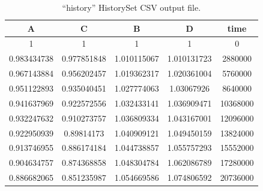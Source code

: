 \begin{table}[h!]
\centering
\caption{``history'' HistorySet CSV output file.}
\label{historyVI.I}
\begin{tabular}{|c|c|c|c|c|}
\hline
\textbf{A}                        & \textbf{C}                       & \textbf{B}                       & \textbf{D}                       & \textbf{time}                 \\ \hline
1                                 & 1                                & 1                                & 1                                & 0                             \\ \hline
0.983434738                       & 0.977851848                      & 1.010115067                      & 1.010131723                      & 2880000                       \\ \hline
0.967143884                       & 0.956202457                      & 1.019362317                      & 1.020361004                      & 5760000                       \\ \hline
0.951122893                       & 0.935040451                      & 1.027774063                      & 1.03067926                       & 8640000                       \\ \hline
0.941637969                       & 0.922572556                      & 1.032433141                      & 1.036909471                      & 10368000                      \\ \hline
0.932247632                       & 0.910273757                      & 1.036809334                      & 1.043167001                      & 12096000                      \\ \hline
0.922950939                       & 0.89814173                       & 1.040909121                      & 1.049450159                      & 13824000                      \\ \hline
0.913746955                       & 0.886174184                      & 1.044738857                      & 1.055757293                      & 15552000                      \\ \hline
0.904634757                       & 0.874368858                      & 1.048304784                      & 1.062086789                      & 17280000                      \\ \hline
0.886682065                       & 0.851235987                      & 1.054669586                      & 1.074806592                      & 20736000                      \\ \hline

\end{tabular}
\end{table}
